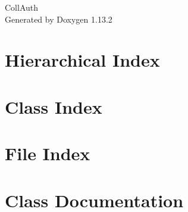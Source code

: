 \documentclass[twoside]{book}
\newcommand{\+}{\discretionary{\mbox{\scriptsize$\hookleftarrow$}}{}{}}
\newcommand{\clearemptydoublepage}{%
    \newpage{\pagestyle{empty}\cleardoublepage}%
  }
\begin{document}
  \raggedbottom
    \hypersetup{pageanchor=false,
                bookmarksnumbered=true,
                pdfencoding=unicode
               }
  \begin{titlepage}
  \vspace*{7cm}
  \begin{center}%
  {\Large Coll\+Auth}\\
  \vspace*{1cm}
  {\large Generated by Doxygen 1.13.2}\\
  \end{center}
  \end{titlepage}
  \clearemptydoublepage
  \tableofcontents
  \clearemptydoublepage
  \hypersetup{pageanchor=true}
\chapter{Hierarchical Index}

\chapter{Class Index}

\chapter{File Index}

\chapter{Class Documentation}



































\end{document}
